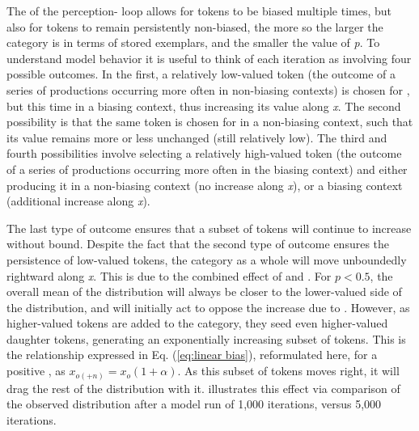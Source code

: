 The  of the perception- loop allows for tokens
to be biased multiple times, but also for tokens to remain persistently
non-biased, the more so the larger the category is in terms of stored
exemplars, and the smaller the value of \emph{p}. To understand model
behavior it is useful to think of each iteration as involving four
possible outcomes. In the first, a relatively low-valued token (the
outcome of a series of productions occurring more often in non-biasing
contexts) is chosen for , but this time in a biasing context,
thus increasing its value along \emph{x}. The second possibility is
that the same token is chosen for  in a non-biasing context,
such that its value remains more or less unchanged (still relatively
low). The third and fourth possibilities involve selecting a relatively
high-valued token (the outcome of a series of productions occurring
more often in the biasing context) and either producing it in a non-biasing
context (no increase along \emph{x}), or a biasing context (additional
increase along \emph{x}). 

The last type of outcome ensures that a subset of tokens will continue
to increase without bound. Despite the fact that the second type of
outcome ensures the persistence of low-valued tokens, the category
as a whole will move unboundedly rightward along \emph{x}. This is
due to the combined effect of  and . For $p<0.5$,
the overall mean of the distribution will always be closer to the
lower-valued side of the distribution, and will initially act to oppose
the increase due to  . However, as higher-valued tokens
are added to the category, they seed even higher-valued daughter tokens,
generating an exponentially increasing subset of tokens. This is the
relationship expressed in Eq. (\ref{eq:linear bias}), reformulated
here, for a positive , as $x_{o(+n)}=x_{o}(1+\alpha)$. As this
subset of tokens moves right, it will drag the rest of the distribution
with it.  illustrates this effect
via comparison of the observed distribution after a model run of 1,000
iterations, versus 5,000 iterations.


